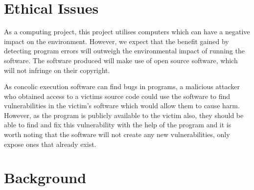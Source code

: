 \documentclass[12pt,twoside]{report}
\begin{document}
\chapter{Ethical Issues}
\endgroup

 As a computing project, this project utilises computers which can have a negative impact on the environment. However, we expect that the benefit gained by detecting program errors will outweigh the environmental impact of running the software. The software produced will make use of open source software, which will not infringe on their copyright.

 As concolic execution software can find bugs in programs, a malicious attacker who obtained access to a victims source code could use the software to find vulnerabilities in the victim's software which would allow them to cause harm. However, as the program is publicly available to the victim also, they should be able to find and fix this vulnerability with the help of the program and it is worth noting that the software will not create any new vulnerabilities, only expose ones that already exist.


\chapter{Background}
\end{document}
